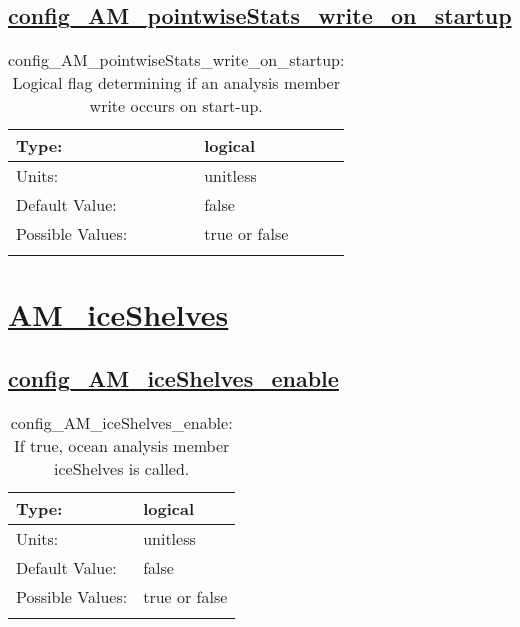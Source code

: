 \subsection[config\_AM\_pointwiseStats\_write\_on\_startup]{\hyperref[sec:nm_tab_AM_pointwiseStats]{config\_AM\_pointwiseStats\_write\_on\_startup}}
\label{subsec:nm_sec_config_AM_pointwiseStats_write_on_startup}
\begin{center}
\begin{longtable}{| p{2.0in} || p{4.0in} |}
    \hline
    Type: & logical \\
    \hline
    Units: & \si{unitless} \\
    \hline
    Default Value: & false \\
    \hline
    Possible Values: & true or false \\
    \hline
    \caption{config\_AM\_pointwiseStats\_write\_on\_startup: Logical flag determining if an analysis member write occurs on start-up.}
\end{longtable}
\end{center}
\section[AM\_iceShelves]{\hyperref[sec:nm_tab_AM_iceShelves]{AM\_iceShelves}}
\label{sec:nm_sec_AM_iceShelves}
\subsection[config\_AM\_iceShelves\_enable]{\hyperref[sec:nm_tab_AM_iceShelves]{config\_AM\_iceShelves\_enable}}
\label{subsec:nm_sec_config_AM_iceShelves_enable}
\begin{center}
\begin{longtable}{| p{2.0in} || p{4.0in} |}
    \hline
    Type: & logical \\
    \hline
    Units: & \si{unitless} \\
    \hline
    Default Value: & false \\
    \hline
    Possible Values: & true or false \\
    \hline
    \caption{config\_AM\_iceShelves\_enable: If true, ocean analysis member iceShelves is called.}
\end{longtable}
\end{center}
